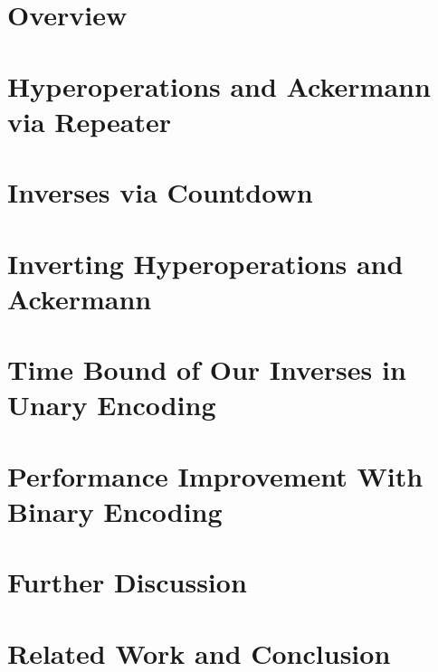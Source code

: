 \documentclass[runningheads]{llncs}
\begin{document}


\section{Overview}
\label{sec: overview}


\section{Hyperoperations and Ackermann via Repeater}
\label{sec: countdown-repeater}


\section{Inverses via Countdown}
\label{sec: countdown}


\section{Inverting Hyperoperations and Ackermann}
\label{sec: inv-hyperop}


\section{Time Bound of Our Inverses in Unary Encoding}
\label{sec: inv-ack}


\section{Performance Improvement With Binary Encoding}
\label{sec: binary}


\section{Further Discussion}
\label{sec: discussion}


\section{Related Work and Conclusion}



\end{document}
